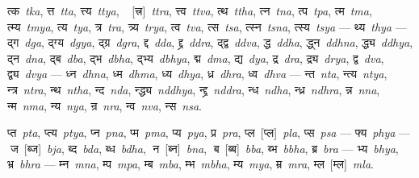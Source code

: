 \documentclass{article}
\newcommand{\siddhanta}[1]{\mbox{\Siddhanta#1}}
\newcommand{\siddhantaII}[1]{\mbox{\SiddhantaII#1}}
\newcommand{\lingual}[1]{\textit{#1}}
\newcommand{\siddhantalingual}[2]{\siddhanta{#1}~\lingual{#2}}
\newcommand{\alt}[2]{#1~[#2]}
\newcommand{\siddhantasiddhantalingual}[3]{\alt{\siddhanta{#1}}{\siddhanta{#2}}~\lingual{#3}}
\newcommand{\siddhantaIIsiddhanta}[2]{\alt{\siddhantaII{#1}}{\siddhanta{#2}}}
\newcommand{\siddhantaIIsiddhantalingual}[3]{\siddhantaIIsiddhanta{#1}{#2}~\lingual{#3}}
\begin{document}
\siddhantalingual{त्क}{tka}, \siddhantalingual{त्त}{tta}, \siddhantalingual{त्त्य}{ttya}, \siddhantasiddhantalingual{}{त्त्र}{ttra}, \siddhantalingual{त्त्व}{ttva}, \siddhantalingual{त्थ}{ttha},
\siddhantalingual{त्न}{tna}, \siddhantalingual{त्प}{tpa}, \siddhantalingual{त्म}{tma}, \siddhantalingual{त्म्य}{tmya}, \siddhantalingual{त्य}{tya}, \siddhantalingual{त्र}{tra},
\siddhantalingual{त्र्य}{trya}, \siddhantalingual{त्व}{tva}, \siddhantalingual{त्स}{tsa}, \siddhantalingual{त्स्न}{tsna}, \siddhantalingual{त्स्य}{tsya} ---  \siddhantalingual{थ्य}{thya} ---
\siddhantalingual{द्ग}{dga}, \siddhantalingual{द्ग्य}{dgya}, \siddhantalingual{द्ग्र}{dgra}, \siddhantalingual{द्द}{dda}, \siddhantalingual{द्द्र}{ddra}, \siddhantalingual{द्द्व}{ddva}, \siddhantalingual{द्ध}{ddha},
\siddhantalingual{द्ध्न}{ddhna}, \siddhantalingual{द्ध्य}{ddhya}, \siddhantalingual{द्न}{dna}, \siddhantalingual{द्ब}{dba}, \siddhantalingual{द्भ}{dbha}, \siddhantalingual{द्भ्य}{dbhya},
\siddhantalingual{द्म}{dma}, \siddhantalingual{द्य}{dya}, \siddhantalingual{द्र}{dra}, \siddhantalingual{द्र्य}{drya}, \siddhantalingual{द्व}{dva}, \siddhantalingual{द्व्य}{dvya} --- \siddhantalingual{ध्न}{dhna},
\siddhantalingual{ध्म}{dhma}, \siddhantalingual{ध्य}{dhya}, \siddhantalingual{ध्र}{dhra}, \siddhantalingual{ध्व}{dhva} --- \siddhantalingual{न्त}{nta}, \siddhantalingual{न्त्य}{ntya},
\siddhantalingual{न्त्र}{ntra}, \siddhantalingual{न्थ}{ntha}, \siddhantalingual{न्द}{nda}, \siddhantalingual{न्द्ध्य}{nddhya}, \siddhantalingual{न्द्द्र}{nddra}, \siddhantalingual{न्ध}{ndha},
\siddhantalingual{न्ध्र}{ndhra}, \siddhantalingual{न्न}{nna}, \siddhantalingual{न्म}{nma}, \siddhantalingual{न्य}{nya}, \siddhantalingual{न्र}{nra}, \siddhantalingual{न्व}{nva}, \siddhantalingual{न्स}{nsa}.

\siddhantalingual{प्त}{pta}, \siddhantalingual{प्त्य}{ptya}, \siddhantalingual{प्न}{pna}, \siddhantalingual{प्म}{pma}, \siddhantalingual{प्य}{pya}, \siddhantalingual{प्र}{pra}, \siddhantaIIsiddhantalingual{प्ल}{प्ल}{pla},
\siddhantalingual{प्स}{psa} --- \siddhantalingual{फ्य}{phya} --- \siddhantasiddhantalingual{ज}{ब्ज}{bja}, \siddhantalingual{ब्द}{bda}, \siddhantalingual{ब्ध}{bdha}, \siddhantasiddhantalingual{न}{ब्न}{bna},
\siddhantasiddhantalingual{ब}{ब्ब}{bba}, \siddhantalingual{ब्भ}{bbha}, \siddhantalingual{ब्र}{bra} --- \siddhantalingual{भ्य}{bhya}, \siddhantalingual{भ्र}{bhra} --- \siddhantalingual{म्न}{mna},
\siddhantalingual{म्प}{mpa}, \siddhantalingual{म्ब}{mba}, \siddhantalingual{म्भ}{mbha}, \siddhantalingual{म्य}{mya}, \siddhantalingual{म्र}{mra}, \siddhantaIIsiddhantalingual{म्ल}{म्ल}{mla}.
\end{document}
